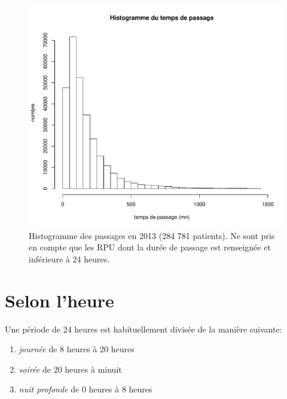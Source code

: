 \documentclass[12pt,english,french,twoside]{book}\usepackage[]{graphicx}\usepackage[]{color}
\makeatletter
\def\maxwidth{ %
  \ifdim\Gin@nat@width>\linewidth
    \linewidth
  \else
    \Gin@nat@width
  \fi
}
\newenvironment{knitrout}{}{} %
\makeatother
\begin{document}
\begin{figure}[ht!]
 \centering
\begin{knitrout}
\color{fgcolor}
\includegraphics[width=\maxwidth]{figure/hist_tous_passages} 

\end{knitrout}

 \caption{Histogramme des passages en 2013 (284 781 patients). Ne sont pris en compte que les RPU dont la durée de passage est renseignée et inférieure à 24 heures.}
 \label{fig:hist_passages}
\end{figure}


\section{Selon l'heure}

Une période de 24 heures est habituellement divisée de la manière suivante:
\begin{enumerate}
  \item \emph{journée} de 8 heures à 20 heures
  \item \emph{soirée} de 20 heures à minuit
  \item  \emph{nuit profonde} de 0 heures à 8 heures
\end{enumerate}
\end{document}
